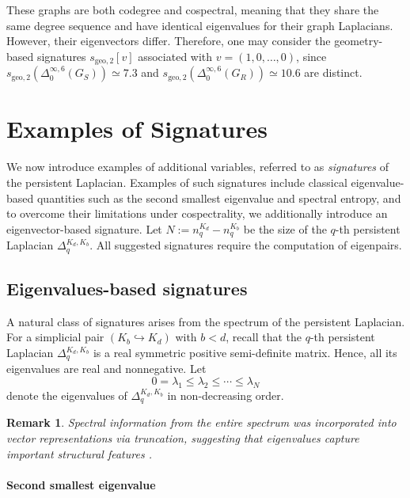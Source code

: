 \documentclass{article}
\newtheorem{remark}[theorem]{Remark}
\begin{document}
These graphs are both codegree and cospectral, meaning that they share the same degree sequence and have identical eigenvalues for their graph Laplacians. However, their eigenvectors differ. Therefore, one may consider the geometry-based signatures $s_{\textrm{geo},2}[v]$ associated with $v = (1,0,\ldots, 0)$, since
$s_{\textrm{geo},2}\left(\Delta^{\infty, 6}_0(G_S)\right) \simeq 7.3$ and
$s_{\textrm{geo},2}\left(\Delta^{\infty, 6}_0(G_R)\right) \simeq 10.6$
are distinct.



\section{Examples of Signatures}\label{subsec:sign}

We now introduce examples of additional variables, referred to as \emph{signatures} of the persistent Laplacian. Examples of such signatures include classical eigenvalue-based quantities such as the second smallest eigenvalue and spectral entropy, and to overcome their limitations under cospectrality, we additionally introduce an eigenvector-based signature. Let $N := n_q^{K_d}-n_q^{K_b}$ be the size of the $q$-th persistent Laplacian $\Delta_q^{K_d,K_b}$. All suggested signatures require the computation of eigenpairs.

\subsection{Eigenvalues-based signatures}

A natural class of signatures arises from the spectrum of the persistent Laplacian. For a simplicial pair $(K_b \hookrightarrow K_d)$ with $b < d$, recall that the $q$-th persistent Laplacian $\Delta^{K_d,K_b}_q$ is a real symmetric positive semi-definite matrix. Hence, all its eigenvalues are real and nonnegative. Let
\[
0 = \lambda_1 \le \lambda_2 \le \cdots \le \lambda_{N}
\]
denote the eigenvalues of $\Delta^{K_d,K_b}_q$ in non-decreasing order.

\begin{remark}
    Spectral information from the entire spectrum was incorporated into vector representations via truncation, suggesting that eigenvalues capture important structural features \cite{davies2023persistent}.
\end{remark}


\paragraph{Second smallest eigenvalue}
\end{document}
